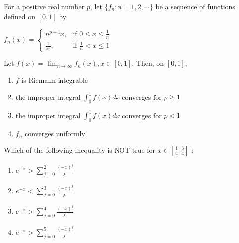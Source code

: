 	\item For a positive real number $p$, let \{$f_n : n=1,2,\cdots$\} be a sequence of functions defined on $[0,1]$ by 
                \begin{center}
                   $ f_n(x) = \begin{cases}
                    n^{p+1}x, & \text{if }  0 \leq x \leq \frac{1}{n} \\
                    \frac{1}{x^p}, & \text{if }  \frac{1}{n} < x \leq 1
                    \end{cases} $
                \end{center}
                Let $f(x) = \lim_{n \to \infty} f_n(x), x \in [0, 1]$. Then, on $[0,1],$ 
                \begin{enumerate}
                    \item $f$ is Riemann integrable
                    \item the improper integral $\int_{0}^{1} f(x) dx$ converges for $p\ge 1$
                    \item the improper integral $\int_{0}^{1} f(x) dx$ converges for $p<1$
                    \item $f_n$ converges uniformly 
                \end{enumerate}

                \item Which of the following inequality is NOT true for $x \in [\frac{1}{4}, \frac{3}{4}]$ :
                \begin{multicols}{2}
                \begin{enumerate}
                    
                      \item $e^{-x} > \sum_{j=0}^{2} \frac{(-x)^j}{j!}$
                      \item $e^{-x} < \sum_{j=0}^{3} \frac{(-x)^j}{j!}$
                       \item $e^{-x} > \sum_{j=0}^{4} \frac{(-x)^j}{j!}$
                       \item $e^{-x} > \sum_{j=0}^{5} \frac{(-x)^j}{j!}$
                \end{enumerate}
                    
                \end{multicols}

